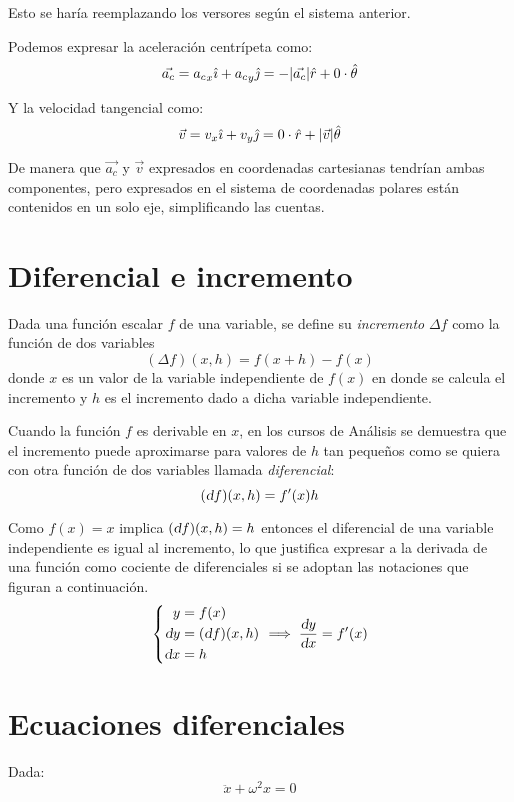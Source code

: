 \documentclass[a5paper,12pt,twoside]{book}
\begin{document}
Esto se haría reemplazando los versores según el sistema anterior.

Podemos expresar la aceleración centrípeta como:
\[ \Vec{a_c} = {a_c}_x \hat{\imath} + {a_c}_y \hat{\jmath} = -{\left| {\Vec{a_c}} \right|} \hat{r} + 0 \cdot \hat{\theta} \]

Y la velocidad tangencial como:
\[ \Vec{v} = v_x \hat{\imath} + v_y \hat{\jmath} = 0 \cdot \hat{r} + {\left| {\Vec{v}} \right|} \hat{\theta}\]

De manera que $\Vec{a_c}$ y $\Vec{v}$ expresados en coordenadas cartesianas tendrían ambas componentes, pero expresados en el sistema de coordenadas polares están contenidos en un solo eje, simplificando las cuentas.


\section{Diferencial e incremento}

Dada una función escalar $f$ de una variable, se define su \emph{incremento} $\Delta f$ como la función de dos variables
\[ \left( \Delta f \right)\!(x, h) = f(x+h) - f(x) \]
donde $x$ es un valor de la variable independiente de $f(x)$ en donde se calcula el incremento y $h$ es el incremento dado a dicha variable independiente.

Cuando la función $f$ es derivable en $x$, en los cursos de Análisis se demuestra que el incremento puede aproximarse para valores de $h$ tan pequeños como se quiera con otra función de dos variables llamada \emph{diferencial}:
\[ \left( \textsl{d} f \right)\!(x, h) = f'(x) h \]

Como $f(x) = x$ implica $\left( \textsl{d} f \right)\!(x, h) = h$ entonces el diferencial de una variable independiente es igual al incremento, lo que justifica expresar a la derivada de una función como cociente de diferenciales si se adoptan las notaciones que figuran a continuación.
\[
  \left\{ \begin{aligned}
    y &= f(x)
    \\
    \textsl{d} y &= \left( \textsl{d} f \right)\!(x, h)
    \\
    \textsl{d} x &= h
  \end{aligned} \right.
  \implies \frac{\textsl{d} y}{\textsl{d} x} = f'(x)
\]


\section{Ecuaciones diferenciales}

Dada:
\[ \ddot{x}+\omega^2 x=0 \]
\end{document}
